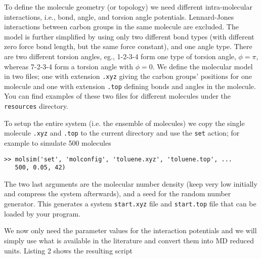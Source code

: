 \documentclass[11pt]{article}
\begin{document}
To define the molecule geometry (or topology) we need different intra-molecular
interactions, i.e., bond, angle, and torsion angle potentials. Lennard-Jones
interactions between carbon groups in the same molecule are excluded. The model is
further simplified by using only two different bond types (with different zero
force bond length, but the same force constant), and one angle type. There are two
different torsion angles, eg., 1-2-3-4 form one type of torsion angle,
$\phi=\pi$, whereas 7-2-3-4 form a torsion angle with $\phi=0$. We define the
molecular model in two files; one with extension \verb!.xyz! giving the carbon
groups' positions for one molecule and one with extension \verb!.top!  defining
bonds and angles in the molecule. You can find examples of these two files for
different molecules under the \verb!resources!  directory.

To setup the entire system (i.e. the ensemble of molecules) we copy the single
molecule \verb!.xyz!  and \verb!.top! to the current directory and use the
\verb!set!  action; for example to simulate 500 molecules
\begin{verbatim}
>> molsim('set', 'molconfig', 'toluene.xyz', 'toluene.top', ... 
   500, 0.05, 42)
\end{verbatim}
The two last arguments are the molecular number density (keep very low initially
and compress the system afterwards), and a seed for the random number
generator. This generates a system \verb!start.xyz! file and \verb!start.top!
file that can be loaded by your program. 

We now only need the parameter values for the interaction potentials and we will
simply use what is available in the literature \cite{Hansen} and convert them
into MD reduced units. Listing 2 shows the resulting script

\bigskip
\end{document}
